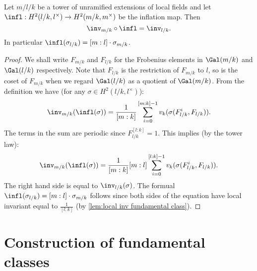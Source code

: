 \begin{lemma} \label{lem:local unram inv infl}
	Let $m / l / k$ be a tower of unramified extensions of local fields
	and let $\infl : H^2(l/k,l^\times) \to H^2(m/k,m^\times)$ be the inflation map.
	Then
	\[
		\inv_{m/k} \circ \infl  = \inv_{l/k}.
	\]
	In particular $\infl(\sigma_{l/k}) = [m:l]\cdot \sigma_{m/k}$.
\end{lemma}

\begin{proof}
	We shall write $F_{m/k}$ and $F_{l/k}$ for the Frobenius elements in $\Gal(m/k)$ and
	$\Gal(l/k)$ respectively. Note that $F_{l/k}$ is the restriction of $F_{m/k}$ to $l$,
	so is the coset of $F_{m/k}$ when we regard $\Gal(l/k)$ as a quotient of $\Gal(m/k)$.
	From the definition we have (for any $\sigma \in H^2(l/k,l^\times)$):
	\[
		\inv_{m/k}(\infl(\sigma))
		= \frac{1}{[m:k]}\sum_{i=0}^{[m:k]-1} v_k(\sigma(F_{l/k}^i,F_{l/k})).
	\]
	The terms in the sum are periodic since $F_{l/k}^{[l:k]}=1$.
	This implies (by the tower law):
	\[
		\inv_{m/k}(\infl(\sigma))
		= \frac{1}{[m:k]} [m:l]\sum_{i=0}^{[l:k]-1} v_k(\sigma(F_{l/k}^i,F_{l/k})).
	\]
	The right hand side is equal to $\inv_{l/k}(\sigma)$.
	The formual $\infl(\sigma_{l/k}) = [m:l]\cdot \sigma_{m/k}$ follows since both sides of the
	equation have local invariant equal to $\frac{1}{[l:k]}$
	(by \ref{lem:local inv fundamental class}).
\end{proof}






\section{Construction of fundamental classes}

